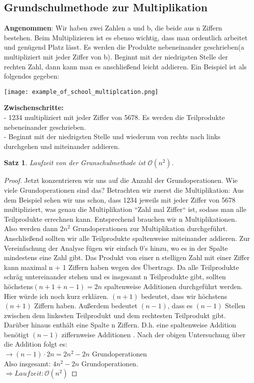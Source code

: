 \documentclass[11pt,a4paper, twoside]{article}
\newtheorem{theorem}{Satz}
\newtheorem{corollary}[theorem]{Folgerung}
\theoremstyle{definition}
\begin{document}

\subsection{Grundschulmethode zur Multiplikation}
\textbf{Angenommen}: Wir haben zwei Zahlen a und b, die beide aus n Ziffern bestehen. Beim Multiplizieren ist es ebenso wichtig, dass man ordentlich arbeitet und genügend Platz lässt. Es werden die Produkte nebeneinander geschrieben(a multipliziert mit jeder Ziffer von b). Beginnt mit der niedrigsten Stelle der rechten Zahl, dann kann man es anschließend leicht addieren. Ein Beispiel ist als folgendes gegeben: \\
\centerline{\texttt{[image: example\_of\_school\_multiplcation.png]}}

\textbf{Zwischenschritte:}\\
- 1234 multipliziert mit jeder Ziffer von 5678. Es werden die Teilprodukte nebeneinander geschrieben.\\
- Beginnt mit der niedrigsten Stelle und wiederum von rechts nach links durchgehen und miteinander addieren.\\ 

\begin{theorem}
Laufzeit von der Grunschulmethode ist $\mathcal{O}(n^2)$.
\end{theorem}
\begin{proof}
Jetzt konzentrieren wir uns auf die Anzahl der Grundoperationen. 
Wie viele Grundoperationen sind das? Betrachten wir zuerst die Multiplikation:
Aus dem Beispiel sehen wir uns schon, dass 1234 jeweils mit jeder Ziffer von 5678 multipliziert, was genau die Multiplikation ``Zahl mal Ziffer`` ist,  sodass man alle Teilprodukte errechnen kann. Entsprechend brauchen wir n Multiplikationen.  Also werden dann $2n^2$ Grundoperationen zur Multiplikation durchgeführt. Anschließend sollten wir alle Teilprodukte spaltenweise miteinander addieren. Zur Vereinfachung der Analyse fügen wir einfach 0’s hinzu, wo es in der Spalte mindestens eine Zahl gibt.  Das Produkt von einer n stelligen Zahl mit einer Ziffer kann maximal n + 1 Ziffern haben wegen des Übertrags. Da alle Teilprodukte schräg untereinander stehen und es insgesamt n Teilprodukte gibt, sollten höchstens$(n+ 1 + n - 1) = 2n$ spaltenweise Additionen durchgeführt werden. Hier würde ich noch kurz erklären. $(n + 1)$ bedeutet, dass wir höchstens $(n+ 1)$ Ziffern haben. Außerdem bedeutet $(n - 1)$, dass es $(n - 1)$ Stellen zwischen dem linkesten Teilprodukt und dem rechtesten Teilprodukt gibt. Darüber hinaus enthält eine Spalte n Ziffern. D.h. eine spaltenweise Addition benötigt $(n - 1)$ ziffernweise Additionen . Nach der obigen Untersuchung über die Addition folgt es: \\
$\rightarrow (n - 1) \cdot 2n = 2n^2 - 2n$ Grundoperationen \\
Also insgesamt: $4n^2 - 2n$ Grundoperationen.\\
$\Rightarrow Laufzeit: \mathcal{O}(n^2)$
\end{proof}
\end{document}
